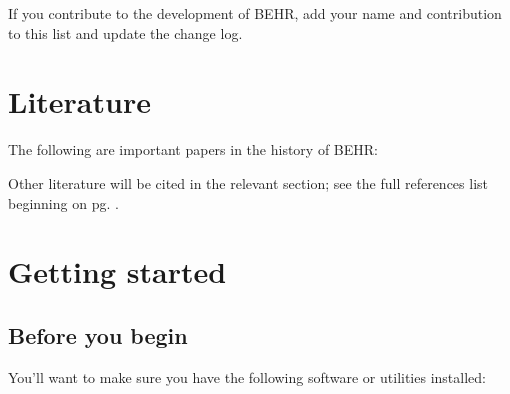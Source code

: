 \documentclass[12pt]{article}
\begin{document}
	If you contribute to the development of BEHR, add your name and contribution to this list and update the change log.

\section{Literature}

	The following are important papers in the history of BEHR:

	\vspace{1em}
	
	\vspace{1em}
	
	\vspace{1em}
	
	\vspace{1em}
	Other literature will be cited in the relevant section; see the full references list beginning on pg. \pageref{thebib}.

\section{Getting started}
	\subsection{Before you begin}

	You'll want to make sure you have the following software or utilities installed:
\end{document}
